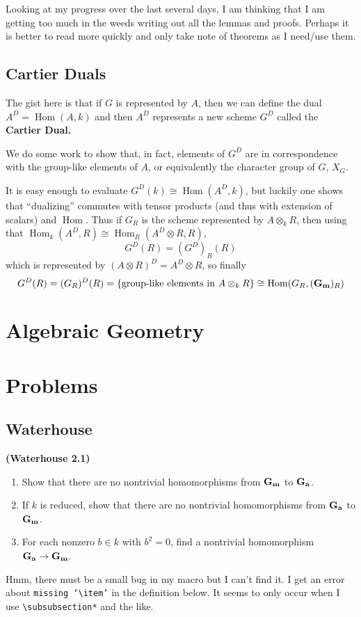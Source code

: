 \documentclass[12pt]{article}
\theoremstyle{nonumberbreak}
\theoremstyle{changebreak}
\theoremstyle{nonumberplain}
\theoremstyle{change}
\newenvironment{wprob}[1]{\begin{prob}{\normalfont\bfseries (Waterhouse #1) }\itshape}{\end{prob}}
\DeclareMathOperator{\Hom}{Hom}
\newcommand*{\Ga}{\ensuremath\mathbf{G_a}}
\newcommand*{\Gm}{\ensuremath\mathbf{G_m}}
\begin{document}
Looking at my progress over the last several days, I am thinking that I am getting
too much in the weeds writing out all the lemmas and proofs. Perhaps it is better to read more quickly
and only take note of theorems as I need/use them.

\subsection{Cartier Duals}
The gist here is that if $G$ is represented by $A$, then we can define the dual 
$A^D=\Hom(A,k)$ and then $A^D$ represents a new scheme $G^D$ called the \textbf{Cartier Dual.}

We do some work to show that, in fact, elements of $G^D$ are in correspondence with the 
group-like elements of $A$, or equivalently the character group of $G$, $X_G$.

It is easy enough to evaluate $G^D(k)\cong\Hom(A^D,k)$, but luckily one shows that
``dualizing'' commutes with tensor products (and thus with extension of scalars) and $\Hom$. Thus
if $G_R$ is the scheme represented by $A\otimes_k R$, then using that $\Hom_k(A^D,R)\cong\Hom_R(A^D\otimes R,R)$,
\[G^D(R)=(G^D)_R(R)\]
which is represented by $(A\otimes R)^D=A^D\otimes R$, so finally 
\[G^D(R)=(G_R)^D(R)=\{\text{group-like elements in }A\otimes_k R\}\cong \Hom(G_R,(\Gm)_R)\]



\newpage
\section{Algebraic Geometry}


\newpage
\section{Problems}

\subsection{Waterhouse}
\begin{wprob}{2.1}
	\begin{enumerate}
		\item Show that there are no nontrivial homomorphisms from $\Gm$ to $\Ga$.
		\item If $k$ is reduced, show that there are no nontrivial homomorphisms from $\Ga$ to $\Gm$.
		\item For each nonzero $b\in k$ with $b^2=0$, find a nontrivial homomorphism $\Ga\to\Gm$.
	\end{enumerate}
\end{wprob}
Hmm, there must be a small bug in my macro but I can't find it. I get an error about \texttt{missing `\textbackslash item'}
in the definition below. It seems to only occur when I use \texttt{\textbackslash subsubsection*} and the like.
\end{document}
